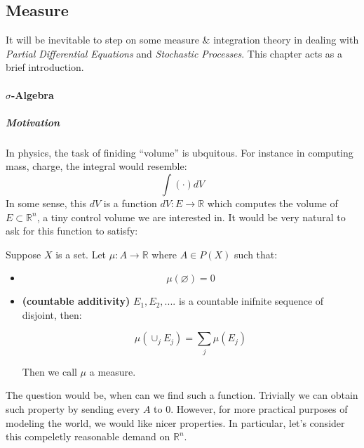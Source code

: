 \subsection{Measure}

%
\providecommand{\argmin}{\operatorname*{arg\,min}}%
\providecommand{\argmax}{\operatorname*{arg\,max}}%
It will be inevitable to step on some measure \& integration theory in dealing with \textit{Partial Differential Equations} and \textit{Stochastic Processes}. This chapter acts as a brief introduction.

\paragraph{$\sigma$-Algebra}

\subparagraph{Motivation}

In physics, the task of finiding ``volume'' is ubquitous. For instance in computing mass, charge, the integral would resemble:
\begin{equation}
\int (\cdot ) dV
\end{equation}
In some sense, this $dV$ is a function $dV:E\to \mathbb{R}$ which computes the volume of $E\subset \mathbb{R}^n$, a tiny control volume we are interested in.  It would be very natural to ask for this function to satisfy:

\begin{definition}[Measure]Suppose $X$ is a set. Let $\mu: A \to \mathbb{R}$ where $A\in P(X)$ such that:

\begin{itemize}
\item \begin{equation}
\mu(\varnothing)=0
\end{equation}


\item \textbf{(countable additivity)} $E_1,E_2,....$ is a countable inifnite sequence of disjoint, then:

\begin{equation}
\mu(\cup_j E_j)=\sum_j \mu(E_j)
\end{equation}


Then we call $\mu$ a measure.
\end{itemize}

\end{definition}The question would be, when can we find such a function. Trivially we can obtain such property by sending every $A$ to 0. However, for more practical purposes of modeling the world, we would like nicer properties. In particular, let's consider this compeletly reasonable demand on $\mathbb{R}^n$.

